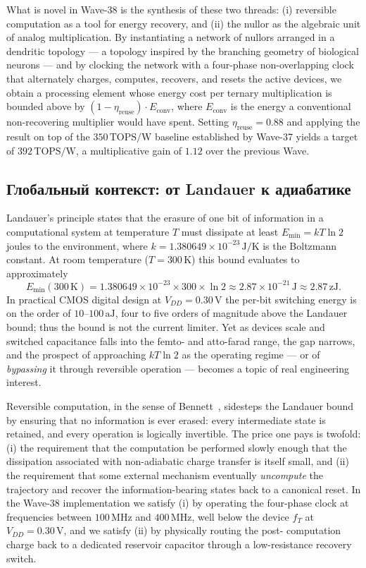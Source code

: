What is novel in Wave-38 is the synthesis of these two threads: (i) reversible
computation as a tool for energy recovery, and (ii) the nullor as the algebraic unit
of analog multiplication.  By instantiating a network of nullors arranged in a
dendritic topology --- a topology inspired by the branching geometry of biological
neurons --- and by clocking the network with a four-phase non-overlapping clock that
alternately charges, computes, recovers, and resets the active devices, we obtain a
processing element whose energy cost per ternary multiplication is bounded above by
$(1-\eta_{\text{reuse}}) \cdot E_{\text{conv}}$, where $E_{\text{conv}}$ is the energy
a conventional non-recovering multiplier would have spent.  Setting
$\eta_{\text{reuse}} = 0.88$ and applying the result on top of the $350\,\text{TOPS/W}$
baseline established by Wave-37 yields a target of $392\,\text{TOPS/W}$, a
multiplicative gain of $1.12$ over the previous Wave.

\subsection{Глобальный контекст: от Landauer к адиабатике}
\label{subsec:landauer_context}

Landauer's principle states that the erasure of one bit of information in a
computational system at temperature $T$ must dissipate at least $E_{\min} = kT \ln 2$
joules to the environment, where $k = 1.380649 \times 10^{-23}\,\text{J/K}$ is the
Boltzmann constant.  At room temperature ($T = 300\,\text{K}$) this bound evaluates
to approximately
\[
  E_{\min}(300\,\text{K}) = 1.380649 \times 10^{-23} \times 300 \times \ln 2
  \approx 2.87 \times 10^{-21}\,\text{J} \approx 2.87\,\text{zJ}.
\]
In practical CMOS digital design at $V_{DD}=0.30\,\text{V}$ the per-bit switching
energy is on the order of $10$--$100\,\text{aJ}$, four to five orders of magnitude
above the Landauer bound; thus the bound is not the current limiter.  Yet as devices
scale and switched capacitance falls into the femto- and atto-farad range, the gap
narrows, and the prospect of approaching $kT\ln 2$ as the operating regime --- or of
\emph{bypassing} it through reversible operation --- becomes a topic of real
engineering interest.

Reversible computation, in the sense of Bennett~\cite{bennett1973logical}, sidesteps
the Landauer bound by ensuring that no information is ever erased: every intermediate
state is retained, and every operation is logically invertible.  The price one pays
is twofold: (i) the requirement that the computation be performed slowly enough that
the dissipation associated with non-adiabatic charge transfer is itself small, and
(ii) the requirement that some external mechanism eventually \emph{uncompute} the
trajectory and recover the information-bearing states back to a canonical reset.  In
the Wave-38 implementation we satisfy (i) by operating the four-phase clock at
frequencies between $100\,\text{MHz}$ and $400\,\text{MHz}$, well below the device
$f_T$ at $V_{DD}=0.30\,\text{V}$, and we satisfy (ii) by physically routing the post-
computation charge back to a dedicated reservoir capacitor through a low-resistance
recovery switch.

